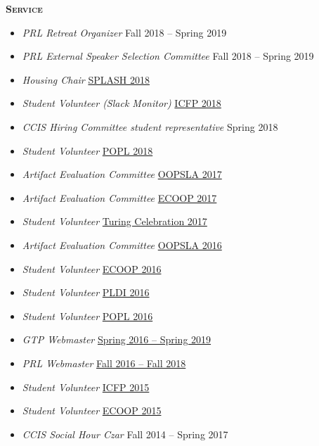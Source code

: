\documentclass{article}
\newcommand{\mysection}[1]{\vspace{0.5cm}
\hspace{-1.3cm}\textsc{\textbf{#1}}~\hrulefill}
\begin{document}
\mysection{Service}
\begin{itemize}
  \item \emph{PRL Retreat Organizer} \hfill {Fall 2018 -- Spring 2019}
  \item \emph{PRL External Speaker Selection Committee} \hfill {Fall 2018 -- Spring 2019}
  \item \emph{Housing Chair} \hfill \href{https://2018.splashcon.org/committee/splash-2018-organizing-committee}{SPLASH 2018}
  \item \emph{Student Volunteer (Slack Monitor)} \hfill \href{https://icfp18.sigplan.org/committee/icfp-2018-organizing-committee}{ICFP 2018}
  \item \emph{CCIS Hiring Committee student representative} \hfill {Spring 2018}
  \item \emph{Student Volunteer} \hfill \href{http://conf.researchr.org/home/POPL-2018}{POPL 2018}
  \item \emph{Artifact Evaluation Committee} \hfill \href{https://2017.splashcon.org/track/splash-2017-OOPSLA-Artifacts}{OOPSLA 2017}
  \item \emph{Artifact Evaluation Committee} \hfill \href{https://2017.ecoop.org/track/ecoop-2017-Artifacts}{ECOOP 2017}
  \item \emph{Student Volunteer} \hfill \href{https://www.acm.org/turing-award-50/conference}{Turing Celebration 2017}
  \item \emph{Artifact Evaluation Committee} \hfill \href{http://2016.splashcon.org/track/splash-2016-artifacts}{OOPSLA 2016}
  \item \emph{Student Volunteer} \hfill \href{http://2016.ecoop.org/}{ECOOP 2016}
  \item \emph{Student Volunteer} \hfill \href{http://conf.researchr.org/home/PLDI-2016}{PLDI 2016}
  \item \emph{Student Volunteer} \hfill \href{http://conf.researchr.org/home/POPL-2016}{POPL 2016}
  \item \emph{GTP Webmaster} \hfill \href{https://github.com/nuprl/gtp.github.io}{Spring 2016 -- Spring 2019}
  \item \emph{PRL Webmaster} \hfill \href{https://github.com/nuprl/website}{Fall 2016 -- Fall 2018}
  \item \emph{Student Volunteer} \hfill \href{http://icfpconference.org/icfp2015/}{ICFP 2015}
  \item \emph{Student Volunteer} \hfill \href{http://2015.ecoop.org/}{ECOOP 2015}
  \item \emph{CCIS Social Hour Czar} \hfill {Fall 2014 -- Spring 2017}
\end{itemize}
\end{document}
